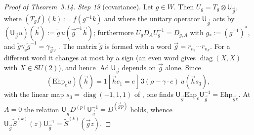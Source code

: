 \documentclass[11pt]{amsart}
\theoremstyle{definition}
\begin{document}
\begin{proof}[Proof of Theorem~5.14]
\emph{Step 19} (covariance).
Let $g\in W$.
Then $U_g=T_g\otimes\mathsf U_{\vec g}$, where $(T_gf)(k):=f(g^{-1}k)$ and where the unitary operator $\mathsf U_{\vec g}$ acts by $(\mathsf U_{\vec g}u)(\vec h):=\tilde g\,u(\vec g^{-1}\vec h)$; furthermore $U_gD_AU_g^{-1}=D_{g_*A}$ with $g_*:=(g^{-1})^*$, and $\tilde g\gamma_v\tilde g^{-1}=\gamma_{\vec gv}$ \cite[Proposition~3.16\,(b)]{QEDII}.
The matrix $\tilde g$ is formed with a word $\vec g=r_{n_1}\cdots r_{n_k}$.
For a different word it changes at most by a sign (an even word gives $\operatorname{diag}(X,X)$ with $X\in SU(2)$), and hence $\operatorname{Ad}\mathsf U_{\vec g}$ depends on $\vec g$ alone.
Since
\begin{equation*}
(\mathrm{Ehp}_eu)(\vec h)=1[\vec he_1=e]\,3(\rho-\gamma\cdot e)\,u(\vec hs_3),
\end{equation*}
with the linear map $s_3=\operatorname{diag}(-1,1,1)$ of \cite{QEDIII}, one finds $\mathsf U_{\vec g}\mathrm{Ehp}_e\mathsf U_{\vec g}^{-1}=\allowbreak \mathrm{Ehp}_{\vec ge}$.
At $A=0$ the relation $\mathsf U_{\vec g}D^{(p)}\mathsf U_{\vec g}^{-1}=D^{(\vec gp)}$ holds, whence $\mathsf U_{\vec g}\tilde S^{(k)}(z)\mathsf U_{\vec g}^{-1}=\allowbreak \tilde S^{(k)}(\vec gz)$.


\end{proof}
\end{document}
